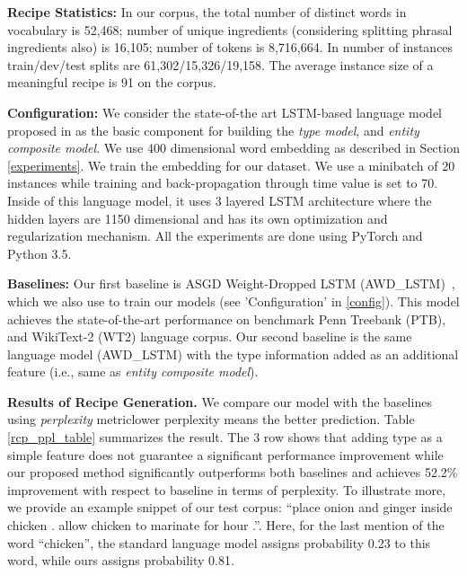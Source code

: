 \documentclass[11pt,a4paper]{article}
\begin{document}
 


\textbf{Recipe Statistics:} In our corpus, the total number of distinct words in vocabulary is 52,468; number of unique ingredients (considering splitting  phrasal ingredients also) is 16,105; number of tokens is  8,716,664. In number of instances train/dev/test splits are  61,302/15,326/19,158. The average instance size of a meaningful recipe is 91 on the corpus. 

\textbf{Configuration:} \label{config}
We consider the state-of-the art LSTM-based language model proposed in \cite{socher} as the basic component for building the {\it type model}, and {\it entity composite model}.
We use 400 dimensional word embedding as described in Section \ref{experiments}. We train the embedding for our dataset. We use a minibatch of 20 instances while training and  back-propagation through time value is set to 70. Inside of this \cite{socher} language model, it uses 3 layered LSTM architecture where the hidden layers are 1150 dimensional and has its own optimization and regularization mechanism. All the experiments are done using PyTorch and Python 3.5.



\textbf{Baselines:} Our first baseline is ASGD Weight-Dropped LSTM (AWD\_LSTM)~\cite{socher}, which we also use to train our models (see 'Configuration' in \ref{config}). This model achieves the state-of-the-art performance on benchmark Penn Treebank (PTB), and WikiText-2 (WT2) language corpus. 
Our second baseline is the same language model (AWD\_LSTM) with the type information added as an additional feature (i.e., same as {\it entity composite model}). 



\textbf{Results of Recipe Generation.} We compare our model with the baselines using {\em perplexity} metric\textemdash lower perplexity means the better prediction.  Table \ref{rcp_ppl_table} summarizes the result. The 3 row shows that adding type as a simple feature does not guarantee  a significant performance improvement while our proposed method significantly outperforms both baselines and achieves 52.2\% improvement with respect to  baseline in terms of perplexity. To illustrate more, we provide an example snippet of our test corpus:
``place onion and ginger inside chicken  . allow chicken to marinate for hour  .''. Here, for the last mention of the word ``chicken'', the standard language model assigns probability 0.23 to this word, while ours assigns probability 0.81. 
\end{document}
